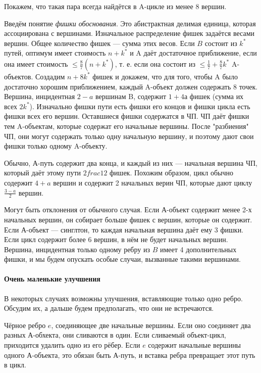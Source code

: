 Покажем, что такая пара всегда найдётся в A-цикле из менее 8 вершин.

Введём понятие \textit{фишки обоснования}. Это абистрактная делимая единица, которая ассоциирована с вершинами. Изначальное распределение фишек задаётся весами вершин. Общее количество фишек --- сумма этих весов.
Если $B$ состоит из $k^*$ путей, оптимум имеет стоимость $n+k^*$ и A даёт достаточное приближение, если она имеет стоимость $\le \frac{8}{7}(n+k^*)$, т. е. если она состоит из $\le \frac{1}{7} + \frac{8}{7}k^*$ A-объектов. Создадим $n+8k^*$ фишек и докажем, что для того, чтобы A было достаточно хорошим приближением, каждый A-объект должен содержать 8 точек.
Вершина, инцидентная $2-a$ вершинам B, содержит $1+4а$ фишек (сумма их всех $2k^*$). Изначально фишки пути есть фишки его концов и фишки цикла есть фишки всех его вершин. Оставшиеся фишки содержатся в ЧП. ЧП даёт фишки тем A-объектам, которые содержат его начальные вершины. После "разбиения" ЧП, они могут содержать только одну начальную вершину, и поэтому дают свои фишки только одному A-объекту.

Обычно, А-путь содержит два конца, и каждый из них --- начальная вершина ЧП, который даёт этому пути $2
frac{1}{2}$ фишек. Похожим образом, цикл обычно содержит $4+a$ вершин и содержит 2 начальных верин ЧП, которые дают циклу $\frac{3-a}{2}$ вершин. 

Могут быть отклонения от обычного случая. Если А-объект содержит менее 2-х начальных вершин, он собирает больше фишек с вершин, которые он содержит. Если А-объект --- синглтон, то каждая начальная вершина даёт ему 3 фишки. Если цикл содержит более 6 вершин, в нём не будет начальных вершин. Вершина, инцидентная только одному ребру из $B$ имеет 4 дополнительных фишки, и мы будем опускать особые случаи, вызванные такими вершинами.

\paragraph{Очень маленькие улучшения}
В некоторых случаях возможны улучшения, вставляющие только одно ребро. Обсудим их, а дальше будем предполагать, что они не встречаются.

Чёрное ребро $e$, соединяющее две начальные вершины. Если оно соединяет два разных А-обхекта, они сливаются в один. Если сливаемый объект-цикл, приходится удалить одно из его рёбер. Если $e$ содержит начальные вершины одного А-объекта, это обязан быть А-путь, и вставка ребра превращает этот путь в цикл.

